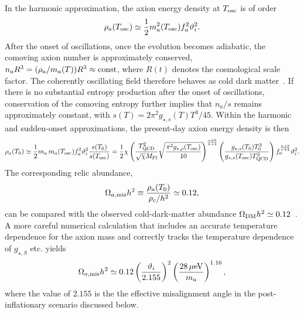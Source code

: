 \documentclass[review]{elsarticle}
\numberwithin{equation}{section}
\numberwithin{table}{section}
\numberwithin{figure}{section}
\begin{document}
In the harmonic approximation, the axion energy density at $T_{\rm osc}$ is of order
\begin{align}
    \rho_a(T_{\rm osc})
    \simeq
    \frac{1}{2}
    m_a^2(T_{\rm osc})
    f_a^2\vartheta_i^2.
    \label{eq:misalignment-energy-onset}
\end{align}
After the onset of oscillations, once the evolution becomes adiabatic, the comoving axion number is approximately conserved, $n_a R^3 = (\rho_a/m_a(T)) R^3 \approx {\rm const}$, where $R(t)$ denotes the cosmological scale factor. The coherently oscillating field therefore behaves as cold dark matter~\cite{Preskill:1982cy,Abbott:1982af,Dine:1982ah,Turner:1985si}. If there is no substantial entropy production after the onset of oscillations, conservation of the comoving entropy further implies that $n_a/s$ remains approximately constant, with
$s(T)=2\pi^2g_{\star,s}(T)T^3/45$. Within the harmonic and sudden-onset approximations, the present-day axion energy density is then
\begin{align}
    \rho_a(T_0)
    \simeq
    \frac{1}{2}
    m_a\,m_a(T_{\rm osc})
    f_a^2\vartheta_i^2
    \frac{s(T_0)}{s(T_{\rm osc})} = \frac{1}{2}\chi \left(\frac{T^2_{\rm QCD}}{\sqrt{\chi} M_{\rm Pl}} \sqrt{\frac{\pi^2 g_{\star,\rho}(T_{\rm osc})}{10}}\right)^{\frac{n+6}{n+4}}\left(\frac{g_{\star,s}(T_0) T_0^3 }{g_{\star,s}(T_{\rm osc}) T_{\rm QCD}^3}\right) f_a^{\frac{n+6}{n+4}}\vartheta_i^2.
    \label{eq:axion-misalignment-density-today}
\end{align}
The corresponding relic abundance,
\begin{align}
    \Omega_{a,\rm mis} h^2
    \equiv
    \frac{\rho_a(T_0)}{\rho_c/h^2} \simeq 0.12 ,
    \label{eq:axion-relic-abundance-definition}
\end{align}
can be compared with the observed cold-dark-matter abundance $\Omega_{\rm DM}h^2\simeq0.12$~\cite{Planck:2018vyg}. A more careful numerical calculation that includes an accurate temperature dependence for the axion mass and correctly tracks the temperature dependence of $g_{\star,S}$ etc. yields~\cite{Borsanyi:2016ksw,OHare:2024nmr}
\begin{align}
    \Omega_{a,\rm mis} h^2 \simeq 0.12 \left(\frac{\vartheta_i}{2.155}\right)^2\left(\frac{28\,{\rm \mu eV}}{m_a}\right)^{1.16},
    \label{eq:Omega-a-h2}
\end{align}
where the value of $2.155$ is the the effective misalignment angle in the post-inflationary scenario discussed below.
 
\end{document}
